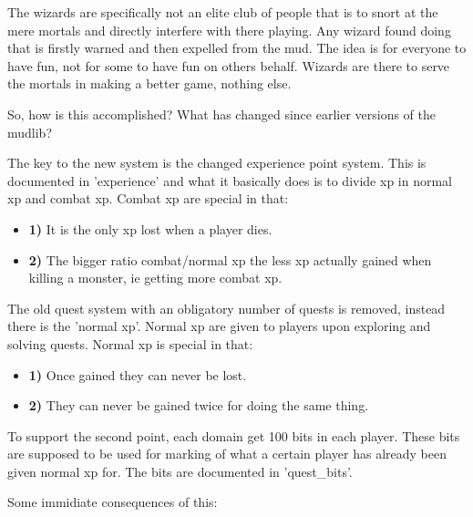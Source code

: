 The wizards are specifically not an elite club of people that is to snort
at the mere mortals and directly interfere with there playing. Any wizard
found doing that is firstly warned and then expelled from the mud. The idea
is for everyone to have fun, not for some to have fun on others behalf. 
Wizards are there to serve the mortals in making a better game, nothing else.

So, how is this accomplished? 
What has changed since earlier versions of the mudlib?

The key to the new system is the changed experience point system. This is
documented in 'experience' and what it basically does is to divide xp in
normal xp and combat xp. Combat xp are special in that:

\begin{itemize}
\item{\bf 1)} It is the only xp lost when a player dies.
\item{\bf 2)} The bigger ratio combat/normal xp the less xp actually gained when
   killing a monster, ie getting more combat xp.
\end{itemize}

The old quest system with an obligatory number of quests is removed, instead
there is the 'normal xp'. Normal xp are given to players upon exploring and
solving quests. Normal xp is special in that:

\begin{itemize}
\item{\bf 1)} Once gained they can never be lost.
\item{\bf 2)} They can never be gained twice for doing the same thing.
\end{itemize}

To support the second point, each domain get 100 bits in each player. These 
bits are supposed to be used for marking of what a certain player has
already been given normal xp for. The bits are documented in 'quest\_bits'.

Some immidiate consequences of this:

